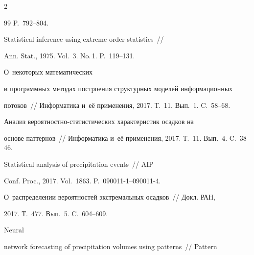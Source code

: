 \begin{multicols}{2}
{{\begin{thebibliography}{99}
P.~792--804.









Statistical inference using extreme order statistics~// 


Ann. Stat., 1975. Vol.~3. No.\,1. P.~119--131.







 О~некоторых математических


и программных методах построения структурных моделей информационных


потоков~// Информатика и~её применения, 2017. Т.~11. Вып.~1. C.~58--68.









Анализ ве\-ро\-ят\-но\-ст\-но-ста\-ти\-сти\-че\-ских характеристик осадков на 


основе паттернов~// Информатика и~её применения, 2017. Т.~11. Вып.~4. C.~38--46.







 Statistical analysis of precipitation events~// AIP


Conf. Proc., 2017. Vol.~1863. P.~\mbox{090011-1}--\mbox{090011-4}.









О~распределении вероятностей экстремальных осадков~// Докл. РАН,


2017. Т.~477. Вып.~5. C.~604--609.







 Neural


network forecasting of precipitation volumes using patterns~// Pattern 



\end{thebibliography}}}
\end{multicols}
